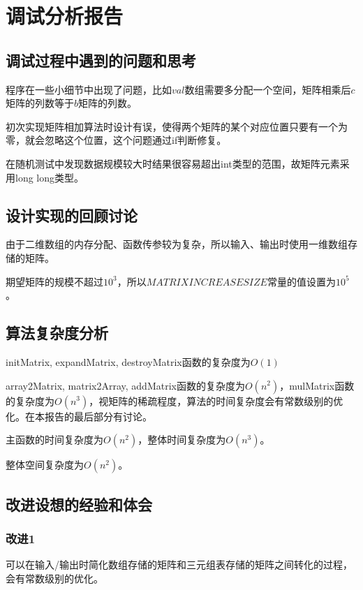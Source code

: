 \documentclass{article}
\begin{document}
\section{调试分析报告}

\subsection{调试过程中遇到的问题和思考}

程序在一些小细节中出现了问题，比如$val$数组需要多分配一个空间，矩阵相乘后$c$矩阵的列数等于$b$矩阵的列数。

初次实现矩阵相加算法时设计有误，使得两个矩阵的某个对应位置只要有一个为零，就会忽略这个位置，这个问题通过if判断修复。

在随机测试中发现数据规模较大时结果很容易超出int类型的范围，故矩阵元素采用long long类型。

\subsection{设计实现的回顾讨论}

由于二维数组的内存分配、函数传参较为复杂，所以输入、输出时使用一维数组存储的矩阵。

期望矩阵的规模不超过$10^3$，所以$MATRIXINCREASESIZE$常量的值设置为$10^5$。

\subsection{算法复杂度分析}

initMatrix, expandMatrix, destroyMatrix函数的复杂度为$O(1)$

array2Matrix, matrix2Array, addMatrix函数的复杂度为$O(n^2)$，mulMatrix函数的复杂度为$O(n^3)$，视矩阵的稀疏程度，算法的时间复杂度会有常数级别的优化。在本报告的最后部分有讨论。

主函数的时间复杂度为$O(n^2)$，整体时间复杂度为$O(n^3)$。

整体空间复杂度为$O(n^2)$。

\subsection{改进设想的经验和体会}

\subsubsection{改进1}

可以在输入/输出时简化数组存储的矩阵和三元组表存储的矩阵之间转化的过程，会有常数级别的优化。
\end{document}
